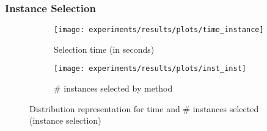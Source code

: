 \documentclass[preprint,12pt]{elsarticle}
\begin{document}



\subsubsection{Instance Selection}


\begin{figure}
\begin{subfigure}{.5\textwidth}
  \centering
  \texttt{[image: experiments/results/plots/time\_instance]}
  \caption{Selection time (in seconds)}
  \label{fig:time-isel}
\end{subfigure}%
\begin{subfigure}{.5\textwidth}
  \centering
  \texttt{[image: experiments/results/plots/inst\_inst]}
  \caption{\# instances selected by method}
  \label{fig:inst-isel}
\end{subfigure}
\caption{Distribution representation for time and \# instances selected (instance selection)}
\label{fig:isel}
\end{figure}
\end{document}
